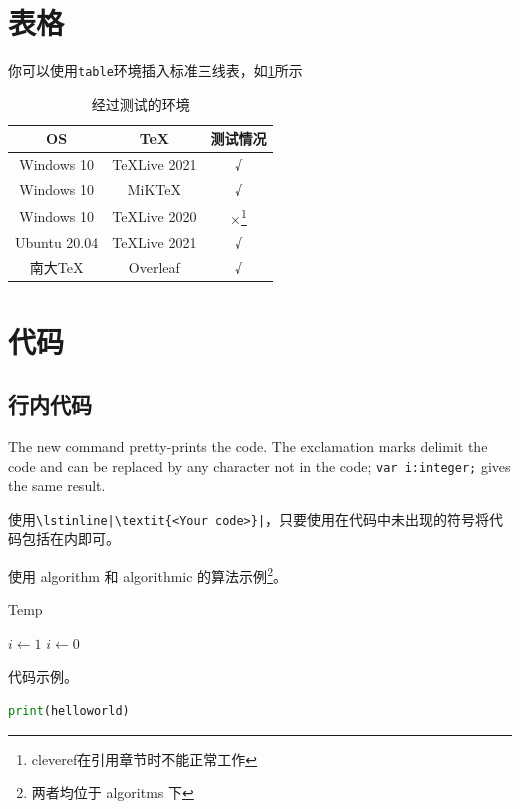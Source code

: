 \section{表格}

你可以使用\lstinline|table|环境插入标准三线表，如\cref{tab:testtab}所示

\begin{table}[htbp]
    \centering
    \caption{经过测试的环境}
    \label{tab:testtab}
    \begin{tabular}{ccc}
        \toprule
        OS & TeX & 测试情况 \\
        \midrule
        Windows 10 & TeXLive 2021 & √ \\
        Windows 10 & MiKTeX & √ \\
        Windows 10 & TeXLive 2020 & ×\footnote{cleveref在引用章节时不能正常工作}  \\
        Ubuntu 20.04 & TeXLive 2021 & √ \\
        南大TeX & Overleaf & √ \\
        \bottomrule
    \end{tabular}
\end{table}

\section{代码}

\subsection{行内代码}
The new command pretty-prints the code. The exclamation marks delimit
the code and can be replaced by any character not in the code;
\verb$var i:integer;$ gives the same result.

使用\lstinline!\lstinline|\textit{<Your code>}|!，只要使用在代码中未出现的符号将代码包括在内即可。

使用 {algorithm} 和 {algorithmic} 的算法示例\footnote{两者均位于 {algoritms} 下}。

\begin{algorithm}[htbp]
    \caption{Temp}
    \begin{algorithmic}
        \STATE $i\gets1$
        \ELSE{}
        \STATE $i\gets0$
        \ENDIF\ENDIF
    \end{algorithmic}
\end{algorithm}

代码示例。

\begin{lstlisting}[language=python]
print(helloworld)
\end{lstlisting}